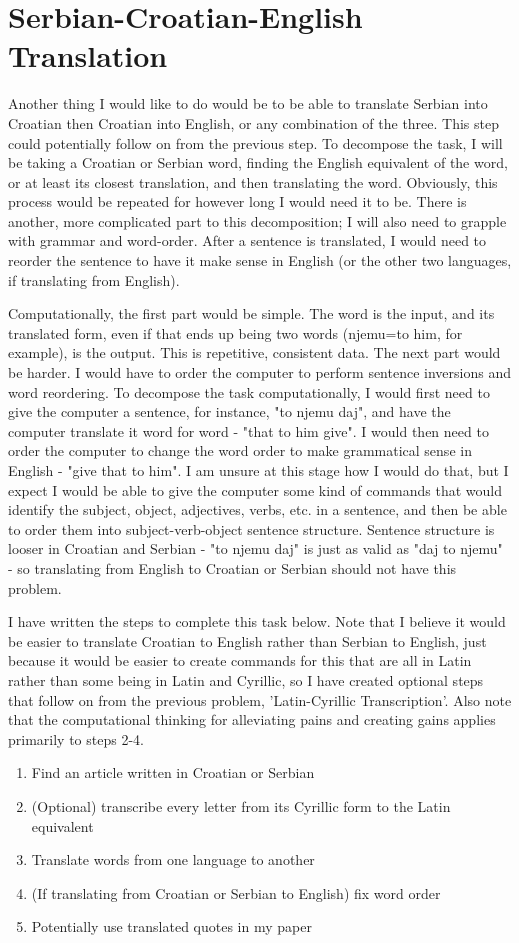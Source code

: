 \documentclass{article}
\begin{document}
\section{Serbian-Croatian-English Translation}
Another thing I would like to do would be to be able to translate Serbian into Croatian  then Croatian into English, or any combination of the three. This step could potentially follow on from the previous step. To decompose the task, I will be taking a Croatian or Serbian word, finding the English equivalent of the word, or at least its closest translation, and then translating the word. Obviously, this process would be repeated for however long I would need it to be. There is another, more complicated part to this decomposition; I will also need to grapple with grammar and word-order. After a sentence is translated, I would need to reorder the sentence to have it make sense in English (or the other two languages, if translating from English).

Computationally, the first part would be simple. The word is the input, and its translated form, even if that ends up being two words (njemu=to him, for example), is the output. This is repetitive, consistent data. The next part would be harder. I would have to order the computer to perform sentence inversions and word reordering. To decompose the task computationally, I would first need to give the computer a sentence, for instance, "to njemu daj", and have the computer translate it word for word - "that to him give". I would then need to order the computer to change the word order to make grammatical sense in English - "give that to him". I am unsure at this stage how I would do that, but I expect I would be able to give the computer some kind of commands that would identify the subject, object, adjectives, verbs, etc. in a sentence, and then be able to order them into subject-verb-object sentence structure. Sentence structure is looser in Croatian and Serbian - "to njemu daj" is just as valid as "daj to njemu" - so translating from English to Croatian or Serbian should not have this problem.

I have written the steps to complete this task below. Note that I believe it would be easier to translate Croatian to English rather than Serbian to English, just because it would be easier to create commands for this that are all in Latin rather than some being in Latin and Cyrillic, so I have created optional steps that follow on from the previous problem, 'Latin-Cyrillic Transcription'. Also note that the computational thinking for alleviating pains and creating gains applies primarily to steps 2-4.
\begin{enumerate}
\item Find an article written in Croatian or Serbian
\item (Optional) transcribe every letter from its Cyrillic form to the Latin equivalent
\item Translate words from one language to another
\item (If translating from Croatian or Serbian to English) fix word order
\item Potentially use translated quotes in my paper
\end{enumerate}
\end{document}
